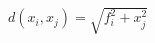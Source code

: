 \documentclass[preview]{standalone}
\begin{document}
\begin{align*}
d(x_i, x_j)= \sqrt{f_i^2 + x_j^2}
\end{align*}
\end{document}
